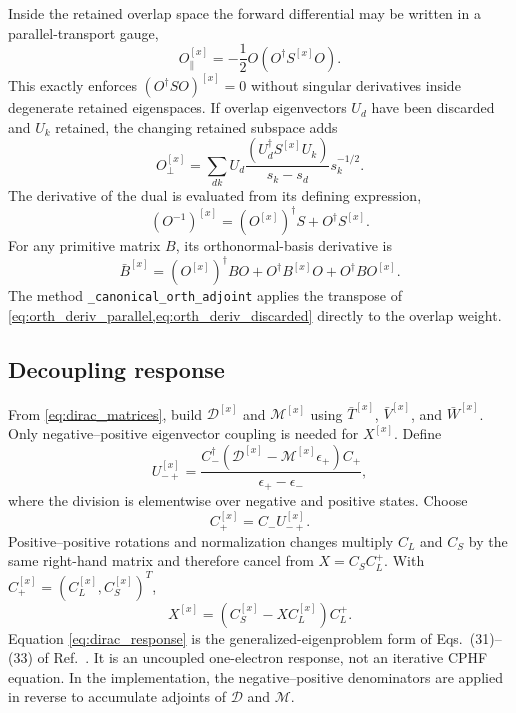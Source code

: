 \documentclass[aip,jcp,preprint]{revtex4-1}
\newcommand{\xcoord}{{[x]}}
\begin{document}
Inside the retained overlap space the forward differential may be written in
a parallel-transport gauge,
\begin{equation}
 O^\xcoord_\parallel
 =-\frac{1}{2}O(O^\dagger S^\xcoord O).
 \label{eq:orth_deriv_parallel}
\end{equation}
This exactly enforces $(O^\dagger S O)^\xcoord=0$ without singular derivatives
inside degenerate retained eigenspaces.  If overlap eigenvectors $U_d$ have
been discarded and $U_k$ retained, the changing retained subspace adds
\begin{equation}
 O^\xcoord_\perp
 =\sum_{dk}U_d
 \frac{(U_d^\dagger S^\xcoord U_k)}{s_k-s_d}
 s_k^{-1/2}.
 \label{eq:orth_deriv_discarded}
\end{equation}
The derivative of the dual is evaluated from its defining expression,
\begin{equation}
 (O^{-1})^\xcoord=(O^\xcoord)^\dagger S+O^\dagger S^\xcoord.
 \label{eq:dual_deriv}
\end{equation}
For any primitive matrix $B$, its orthonormal-basis derivative is
\begin{equation}
 \bar B^\xcoord=(O^\xcoord)^\dagger BO
 +O^\dagger B^\xcoord O+O^\dagger BO^\xcoord.
 \label{eq:transformed_integral_deriv}
\end{equation}
The method \texttt{\_canonical\_orth\_adjoint} applies the transpose of
\cref{eq:orth_deriv_parallel,eq:orth_deriv_discarded} directly to the overlap
weight.

\subsection{Decoupling response}

From \cref{eq:dirac_matrices}, build $\mathcal D^\xcoord$ and
$\mathcal M^\xcoord$ using $\bar T^\xcoord$, $\bar V^\xcoord$, and
$\bar W^\xcoord$.  Only negative--positive eigenvector coupling is needed for
$X^\xcoord$.  Define
\begin{equation}
 U_{-+}^\xcoord=
 \frac{C_-^\dagger
 (\mathcal D^\xcoord-\mathcal M^\xcoord\epsilon_+)C_+}
 {\epsilon_+-\epsilon_-},
 \label{eq:dirac_response}
\end{equation}
where the division is elementwise over negative and positive states.  Choose
\begin{equation}
 C_+^\xcoord=C_-U_{-+}^\xcoord.
\end{equation}
Positive--positive rotations and normalization changes multiply $C_L$ and
$C_S$ by the same right-hand matrix and therefore cancel from $X=C_SC_L^+$.
With $C_+^\xcoord=(C_L^\xcoord,C_S^\xcoord)^T$,
\begin{equation}
 X^\xcoord=(C_S^\xcoord-XC_L^\xcoord)C_L^+.
 \label{eq:x_deriv}
\end{equation}
Equation \eqref{eq:dirac_response} is the generalized-eigenproblem form of
Eqs.~(31)--(33) of Ref.~.  It is an uncoupled
one-electron response, not an iterative CPHF equation.  In the implementation,
the negative--positive denominators are applied in reverse to accumulate
adjoints of $\mathcal D$ and $\mathcal M$.
\end{document}
